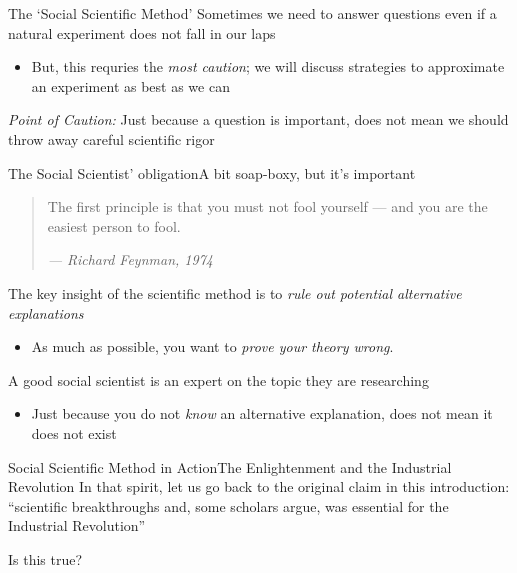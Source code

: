 \documentclass[aspectratio=169,t,11pt,table]{beamer}
\begin{document}
\begin{frame}{The `Social Scientific Method'}
  Sometimes we need to answer questions even if a natural experiment does not fall in our laps
  \begin{itemize}    
    \item But, this requries the \emph{most caution}; we will discuss strategies to approximate an experiment as best as we can
  \end{itemize}

  \bigskip
  \emph{Point of Caution:} Just because a question is important, does not mean we should throw away careful scientific rigor
\end{frame}

\begin{frame}{The Social Scientist' obligation}{A bit soap-boxy, but it's important}
  \begin{quote}
    The first principle is that you must not fool yourself — and you are the easiest person to fool.

    \emph{— Richard Feynman, 1974}
  \end{quote}

  \bigskip
  The key insight of the scientific method is to \emph{rule out potential alternative explanations}
  \begin{itemize}
    \item As much as possible, you want to \emph{prove your theory wrong}. 
  \end{itemize}

  \bigskip
  A good social scientist is an expert on the topic they are researching
  \begin{itemize}
    \item Just because you do not \emph{know} an alternative explanation, does not mean it does not exist
  \end{itemize}
\end{frame}


\begin{frame}{Social Scientific Method in Action}{The Enlightenment and the Industrial Revolution}
  In that spirit, let us go back to the original claim in this introduction: 
  ``scientific breakthroughs and, some scholars argue, was essential for the Industrial Revolution''

  \bigskip
  Is this true?
\end{frame}
\end{document}
